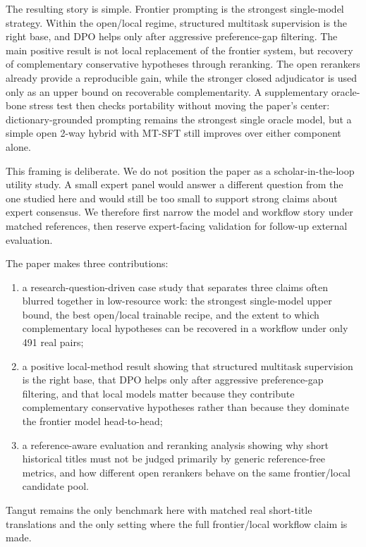 The resulting story is simple. Frontier prompting is the strongest single-model strategy. Within the open/local regime, structured multitask supervision is the right base, and DPO helps only after aggressive preference-gap filtering. The main positive result is not local replacement of the frontier system, but recovery of complementary conservative hypotheses through reranking. The open rerankers already provide a reproducible gain, while the stronger closed adjudicator is used only as an upper bound on recoverable complementarity. A supplementary oracle-bone stress test then checks portability without moving the paper's center: dictionary-grounded prompting remains the strongest single oracle model, but a simple open 2-way hybrid with MT-SFT still improves over either component alone.

This framing is deliberate. We do not position the paper as a scholar-in-the-loop utility study. A small expert panel would answer a different question from the one studied here and would still be too small to support strong claims about expert consensus. We therefore first narrow the model and workflow story under matched references, then reserve expert-facing validation for follow-up external evaluation.

The paper makes three contributions:
\begin{enumerate}
\item a research-question-driven case study that separates three claims often blurred together in low-resource work: the strongest single-model upper bound, the best open/local trainable recipe, and the extent to which complementary local hypotheses can be recovered in a workflow under only 491 real pairs;
\item a positive local-method result showing that structured multitask supervision is the right base, that DPO helps only after aggressive preference-gap filtering, and that local models matter because they contribute complementary conservative hypotheses rather than because they dominate the frontier model head-to-head;
\item a reference-aware evaluation and reranking analysis showing why short historical titles must not be judged primarily by generic reference-free metrics, and how different open rerankers behave on the same frontier/local candidate pool.
\end{enumerate}

Tangut remains the only benchmark here with matched real short-title translations and the only setting where the full frontier/local workflow claim is made.
